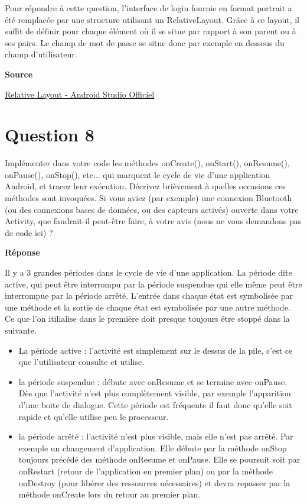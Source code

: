\documentclass[francais,12pt]{article}
\begin{document}
		Pour répondre à cette question, l'interface de login fournie en format portrait a été remplacée par
une structure utilisant un RelativeLayout. Grâce à ce layout, il suffit de définir pour chaque élément où il se situe par rapport à son parent ou à ses pairs. Le champ de mot de passe se situe donc par exemple en dessous du champ d'utilisateur. 
		
		\textbf{Source}
        
        \href{https://developer.android.com/guide/topics/ui/layout/relative.html}{Relative Layout - Android Studio Officiel}
		
	\section*{Question 8}
		Implémenter dans votre code les méthodes onCreate(), onStart(), onResume(), onPause(), onStop(), etc... qui marquent le cycle de vie d'une application Android, et tracez leur exécution. Décrivez brièvement à quelles occasions ces méthodes sont invoquées. Si vous aviez (par exemple) une connexion Bluetooth (ou des connexions bases de données, ou des capteurs activés) ouverte dans votre Activity, que faudrait-il peut-être faire, à votre avis (nous ne vous demandons pas de code ici) ? 
		
		{\color[rgb]{0,0.5,0.23}\textbf{Réponse}}
        
		Il y a 3 grandes périodes dans le cycle de vie d'une application. La période dite active, qui peut être interrompu par la période
		suspendue qui elle même peut être interrompue par la période arrêté.
		L'entrée dans chaque état est symbolisée par une méthode et la sortie de chaque état est symbolisée par une autre méthode. Ce que l'on itilialise dans le première doit presque toujours être stoppé dans la suivante.
		
		\begin{itemize}
			\item La période active : l'activité est simplement sur le dessus de la pile, c'est ce que l'utilisateur consulte et utilise. 
			\item la période suspendue : débute avec onResume et se termine avec onPause. Dès que l'activité n'est plus complètement visible, par exemple l'apparition d'une boite de dialogue. Cette période est fréquente il faut donc qu'elle soit rapide et qu'elle utilise peu le processeur.
			\item la période arrêté : l'activité n'est plus visible, mais elle n'est pas arrêté. Par exemple un changement d'application. Elle débute par la méthode onStop toujours précédé des méthode onResume et onPause. Elle se poursuit soit par onRestart (retour de l'application en premier plan) ou par la méthode onDestroy (pour libérer des ressources nécessaires) et devra repasser par la méthode onCreate lors du retour au premier plan.
		\end{itemize}
		
\end{document}
